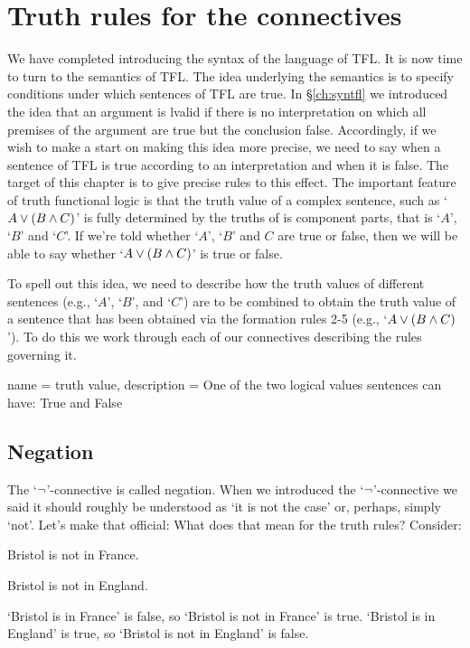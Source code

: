 \section{Truth rules for the connectives}\label{sec:tt}
We have completed introducing the syntax of the language of TFL. It is now time to turn to the semantics of TFL. The idea underlying the semantics is to specify conditions under which sentences of TFL are true. In \S\ref{ch:syntfl} we introduced the idea that an argument is lvalid if there is no interpretation on which all premises of the argument are true but the conclusion false. Accordingly, if we wish to make a start on making this idea more precise, we need to say when a sentence of TFL is true according to an interpretation and when it is false. The target of this chapter is to give precise rules to this effect. The important feature of truth functional logic is that the truth value of a complex sentence, such as `$A\vee(B\mathbin{\wedge} C)$' is fully determined by the truths of is component parts, that is `$A$', `$B$' and `$C$'. If we're told whether `$A$', `$B$' and $C$ are true or false, then we will be able to say whether `$A\vee(B\mathbin{\wedge} C)$' is true or false.

To spell out this idea, we need to describe how the truth values of different sentences (e.g., `$A$', `$B$', and `$C$') are to be combined to obtain the truth value of a sentence  that has been obtained via the formation rules 2-5 (e.g., `$A\vee(B\mathbin{\wedge} C)$'). To do this we work through each of our connectives describing the rules governing it.

                 {
                   name = truth value,
                   description = {One of the two logical values sentences can have: True and False}
                   }


\subsection{Negation}
The `$\neg$'-connective is called negation. When we introduced the `$\neg$'-connective we said it should roughly be understood as `it is not the case' or, perhaps, simply `not'. Let's make that official:
What does that mean for the truth rules? Consider:
\begin{earg}
\item[\ex{neg-f}] Bristol is not in France.
\item[\ex{neg-f}] Bristol is not in England.
\end{earg}
`Bristol is in France' is false, so `Bristol is not in France' is true.
`Bristol is in England' is true, so `Bristol is not in England' is false.


